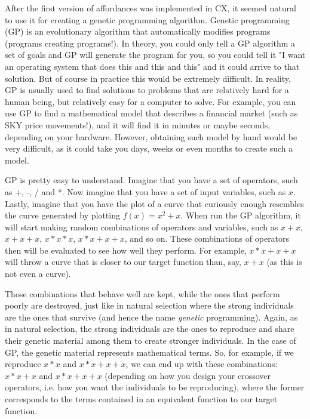 \documentclass[11pt,fleqn,openany]{book} %
\begin{document}
After the first version of affordances was implemented in CX, it seemed natural to use it for creating a genetic programming algorithm. Genetic programming (GP) is an evolutionary algorithm that automatically modifies programs (programs creating programs!). In theory, you could only tell a GP algorithm a set of goals and GP will generate the program for you, so you could tell it "I want an operating system that does this and this and this" and it could arrive to that solution. But of course in practice this would be extremely difficult. In reality, GP is usually used to find solutions to problems that are relatively hard for a human being, but relatively easy for a computer to solve. For example, you can use GP to find a mathematical model that describes a financial market (such as SKY price movements!), and it will find it in minutes or maybe seconds, depending on your hardware. However, obtaining such model by hand would be very difficult, as it could take you days, weeks or even months to create such a model.

GP is pretty easy to understand. Imagine that you have a set of operators, such as +, -, / and *. Now imagine that you have a set of input variables, such as $x$. Lastly, imagine that you have the plot of a curve that curiously enough resembles the curve generated by plotting $f(x) = x^2 + x$. When run the GP algorithm, it will start making random combinations of operators and variables, such as $x+x$, $x+x+x$, $x*x*x$, $x*x + x + x$, and so on. These combinations of operators then will be evaluated to see how well they perform. For example, $x * x + x + x$ will throw a curve that is closer to our target function than, say, $x + x$ (as this is not even a curve).

Those combinations that behave well are kept, while the ones that perform poorly are destroyed, just like in natural selection where the strong individuals are the ones that survive (and hence the name \emph{genetic} programming). Again, as in natural selection, the strong individuals are the ones to reproduce and share their genetic material among them to create stronger individuals. In the case of GP, the genetic material represents mathematical terms. So, for example, if we reproduce $x * x$ and $x * x + x + x$, we can end up with these combinations: $x * x + x$ and $x * x + x + x$ (depending on how you design your crossover operators, i.e. how you want the individuals to be reproducing), where the former corresponds to the terms contained in an equivalent function to our target function.
\end{document}
